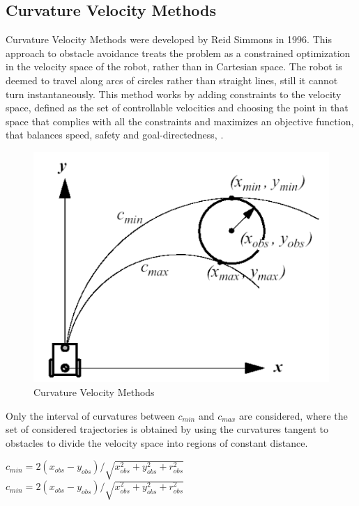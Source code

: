 \subsection{Curvature Velocity Methods}
Curvature Velocity Methods were developed by Reid Simmons in 1996.
This approach to obstacle avoidance treats the problem as a constrained optimization in the velocity space of the robot, rather than in Cartesian space.
The robot is deemed to travel along arcs of circles rather than straight lines, still it cannot turn instantaneously.
This method works by adding constraints to the velocity space, defined as the set of controllable velocities and choosing the point in that space that complies with all the constraints and maximizes an objective function, that balances speed, safety and goal-directedness, \citet{simmons}.
\begin{figure}[H]
    \centering
    \includegraphics[scale= 0.5]{Images/Chapter 4/vcm.png}
    \caption{Curvature Velocity Methods}
    \label{fig:cvm}
\end{figure}
Only the interval of curvatures between $c_{min}$ and $c_{max}$ are considered, where the set of considered trajectories is obtained by using the curvatures tangent to obstacles to divide the velocity space  into regions of constant distance.

$ c_{min} = 2(x_{obs}-y_{obs})/\sqrt{x^2_{obs} + y^2_{obs} + r^2_{obs}}$
$
    c_{min} = 2(x_{obs}-y_{obs})/\sqrt{x^2_{obs} + y^2_{obs} + r^2_{obs}}
$
\newpage
